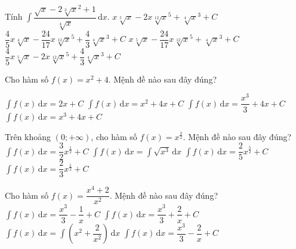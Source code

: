 \begin{ex}%
	Tính $\displaystyle\int{\dfrac{\sqrt{x}-2\sqrt[3]x^2+1}{\sqrt[4]x}\mathrm{\,d}x}$.
	\choice
	{$x\sqrt[5]x-2x\sqrt[12]x^5+\sqrt[4]x^3+C$}
	{\True $\dfrac{4}{5}x\sqrt[4]x-\dfrac{24}{17}x\sqrt[12]x^5+\dfrac{4}{3}\sqrt[4]x^3+C$}
	{$x\sqrt[5]x-\dfrac{24}{17}x\sqrt[12]x^5+\sqrt[4]x^3+C$}
	{$\dfrac{4}{5}x\sqrt[5]x-2x\sqrt[12]x^5+\dfrac{4}{3}\sqrt[4]x^3+C$}
\end{ex}

\begin{ex}%
	Cho hàm số $f(x)=x^2+4$. Mệnh đề nào sau đây đúng?
	
	\choice
	{$\displaystyle{\displaystyle\int f(x)\mathrm{\,d}x=2 x+C}$}
	{$\displaystyle{\displaystyle\int f(x)\mathrm{\,d}x=x^2+4 x+C}$}
	{\True $\displaystyle{\displaystyle\int f(x)\mathrm{\,d}x=\dfrac{x^3}{3}+4 x+C}$}
	{$\displaystyle{\displaystyle\int f(x)\mathrm{\,d}x=x^3+4 x+C}$}
\end{ex}
\begin{ex}%
	Trên khoảng $(0;+\infty)$, cho hàm số $f(x)=x^{\frac{3}{2}}$. Mệnh đề nào sau đây đúng?
	\choice
	{$\displaystyle\int{f(x)}\mathrm{\,d}x=\dfrac{3}{2}x^{\frac{1}{2}}+C$}
	{$\displaystyle\int{f(x)}\mathrm{\,d}x=\displaystyle\int{\sqrt{x^3}}\mathrm{\,d}x$}
	{\True $\displaystyle\int{f(x)}\mathrm{\,d}x=\dfrac{2}{5}x^{\frac{5}{2}}+C$}
	{$\displaystyle\int{f(x)}\mathrm{\,d}x=\dfrac{2}{3}x^{\frac{1}{2}}+C$}
\end{ex}

\begin{ex}%
	Cho hàm số $f(x)=\dfrac{x^4+2}{x^2}$. Mệnh đề nào sau đây đúng?
	\choice
	{$\displaystyle\int{f(x)\mathrm{\,d}x=}\dfrac{x^3}{3}-\dfrac{1}{x}+C$}
	{$\displaystyle\int{f(x)\mathrm{\,d}x=}\dfrac{x^3}{3}+\dfrac{2}{x}+C$}
	{$\displaystyle\int{f(x)\mathrm{\,d}x=}\displaystyle\int{\left(x^2+\dfrac{2}{x^2}\right)}\mathrm{\,d}x$}
	{\True $\displaystyle\int{f(x)\mathrm{\,d}x=}\dfrac{x^3}{3}-\dfrac{2}{x}+C$}
\end{ex}

